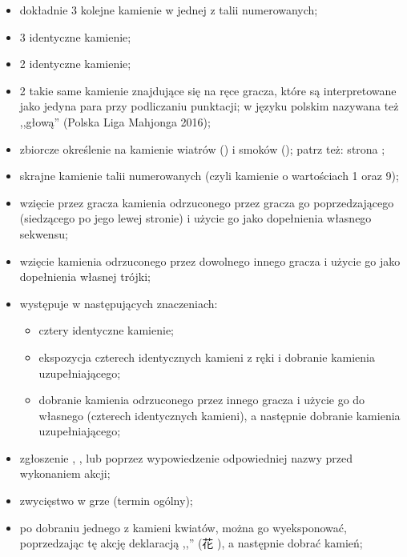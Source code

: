 \begin{itemize}
\pageref{reka});
\item {}
dokładnie 3 kolejne kamienie w jednej z talii numerowanych;
\item {}
3 identyczne kamienie;
\item {}
2 identyczne kamienie;
\item {}
2 takie same kamienie znajdujące się na ręce gracza, które są interpretowane 
jako jedyna para przy podliczaniu punktacji; w języku polskim nazywana też
,,głową'' (Polska Liga Mahjonga 2016);
\item {}
zbiorcze określenie na kamienie wiatrów (\wiatry) i smoków (\smoki); patrz też:
strona \pageref{wiatry};
\item {}
skrajne kamienie talii numerowanych (czyli kamienie o wartościach 1 oraz 9);
\item {}
wzięcie przez gracza kamienia odrzuconego przez gracza go poprzedzającego
(siedzącego po jego lewej stronie) i użycie go jako dopełnienia własnego
sekwensu;
\item {}
wzięcie kamienia odrzuconego przez dowolnego innego gracza i użycie go jako
dopełnienia własnej trójki; 
\item {}
występuje w następujących znaczeniach:
	\begin{itemize}
	  \item cztery identyczne kamienie;
	  \item ekspozycja czterech identycznych kamieni z ręki i dobranie kamienia
	  uzupełniającego;
	  \item dobranie kamienia odrzuconego przez innego gracza i użycie go do
	  własnego  (czterech identycznych kamieni), a następnie dobranie
	  kamienia uzupełniającego;
	\end{itemize}
\item {}
zgłoszenie , ,  lub
\hu poprzez wypowiedzenie odpowiedniej nazwy przed wykonaniem akcji;
\item {}
zwycięstwo w grze (termin ogólny);
\item {}
po dobraniu jednego z kamieni kwiatów, można go wyeksponować, poprzedzając tę
akcję deklaracją ,,'' (花 ), a następnie dobrać kamień;

\end{itemize}

